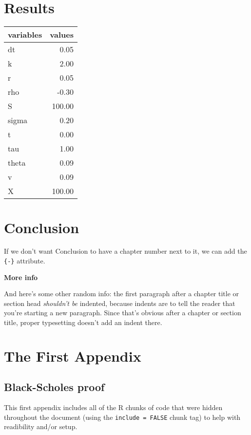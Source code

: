 \documentclass[12pt,twoside]{reedthesis}
\theoremstyle{definition}
\theoremstyle{definition}
\theoremstyle{remark}
\begin{document}
  \chapter{Results}\label{results}
  \begin{tabular}{l|r}
  \hline
  variables & values\\
  \hline
  dt & 0.05\\
  \hline
  k & 2.00\\
  \hline
  r & 0.05\\
  \hline
  rho & -0.30\\
  \hline
  S & 100.00\\
  \hline
  sigma & 0.20\\
  \hline
  t & 0.00\\
  \hline
  tau & 1.00\\
  \hline
  theta & 0.09\\
  \hline
  v & 0.09\\
  \hline
  X & 100.00\\
  \hline
  \end{tabular}
  \chapter{Conclusion}\label{conclusion}
  
  If we don't want Conclusion to have a chapter number next to it, we can
  add the \texttt{\{-\}} attribute.
  
  \textbf{More info}
  
  And here's some other random info: the first paragraph after a chapter
  title or section head \emph{shouldn't be} indented, because indents are
  to tell the reader that you're starting a new paragraph. Since that's
  obvious after a chapter or section title, proper typesetting doesn't add
  an indent there.
  
  \appendix
  
  \chapter{The First Appendix}\label{the-first-appendix}
  
  \section{Black-Scholes proof}\label{bsformula}
  
  This first appendix includes all of the R chunks of code that were
  hidden throughout the document (using the \texttt{include\ =\ FALSE}
  chunk tag) to help with readibility and/or setup.
  
\end{document}
